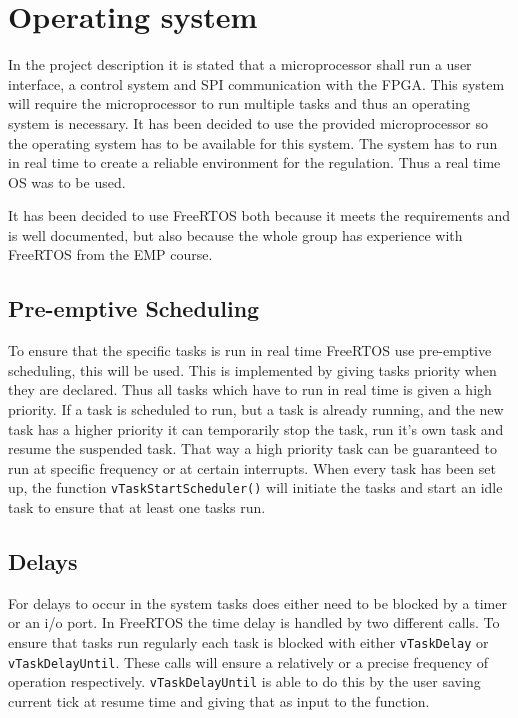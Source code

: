 \chapter{Operating system}\label{chap:os}



In the project description it is stated that a microprocessor shall run a user interface, a control system and SPI communication with the FPGA. This system will require the microprocessor to run multiple tasks and thus an operating system is necessary. It has been decided to use the provided microprocessor so the operating system has to be available for this system. The system has to run in real time to create a reliable environment for the regulation. Thus a real time OS was to be used.

It has been decided to use FreeRTOS both because it meets the requirements and is well documented, but also because the whole group has experience with FreeRTOS from the EMP course.

\section{ Pre-emptive Scheduling }


To ensure that the specific tasks is run in real time FreeRTOS use pre-emptive scheduling, this will be used. This is implemented by giving tasks priority when they are declared. Thus all tasks which have to run in real time is given a high priority. If a task is scheduled to run, but a task is already running, and the new task has a higher priority it can temporarily stop the task, run it's own task and resume the suspended task. That way a high priority task can be guaranteed to run at specific frequency or at certain interrupts. When every task has been set up, the function \texttt{vTaskStartScheduler()} will initiate the tasks and start an idle task to ensure that at least one tasks run.


\section{ Delays  }

For delays to occur in the system tasks does either need to be blocked by a timer or an i/o port. In FreeRTOS the time delay is handled by two different calls. To ensure that tasks run regularly each task is blocked with either \texttt{vTaskDelay} or \texttt{vTaskDelayUntil}. These calls will ensure a relatively or a precise frequency of operation respectively.  \texttt{vTaskDelayUntil} is able to do this by the user saving current tick at resume time and giving that as input to the function.
 
